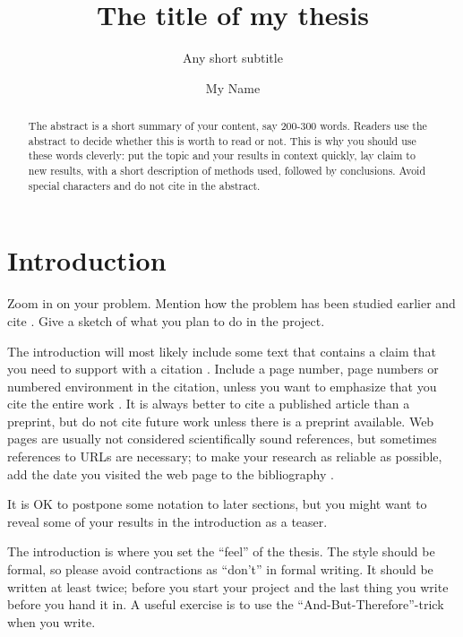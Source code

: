 \documentclass[UKenglish,bachelor]{uiomaster}  %
\title{The title of my thesis}        %
\subtitle{Any short subtitle}         %
\author{My Name}                      %
\begin{document}
\uiomasterfp[dept={Department of Mathematics},  %
  program={MAT2000 Project work in Mathematics},                        %
  supervisor={Terence Tao},                    %
  bachelor,                                   %
  color=green]                                  %


\tableofcontents

\begin{abstract}
\noindent The abstract is a short summary of your content, say 200-300 words. Readers use the abstract to decide whether this is worth to read or not. This is why you should use these words cleverly: put the topic and your results in context quickly, lay claim to new results, with a short description of methods used, followed by conclusions. Avoid special characters and do not cite in the abstract.   
\end{abstract}


\section{Introduction}
\label{intro}
Zoom in on your problem. Mention how the problem has been studied earlier and cite \parencite{MMS22}. Give a sketch of what you plan to do in the project. 

The introduction will most likely include some text that contains a claim that you need to support with a citation \cite[33--34]{AM69}. Include a page number, page numbers or numbered environment in the citation, unless you want to emphasize that you cite the entire work \cite[Theorem~1]{AM69}. It is always better to cite a published article than a preprint, but do not cite future work unless there is a preprint available. Web pages are usually not considered scientifically sound references, but sometimes references to URLs are necessary; to make your research as reliable as possible, add the date you visited the web page to the bibliography \cite{Bib15}.

It is OK to postpone some notation to later sections, but you might want to reveal some of your results in the introduction as a teaser.

The introduction is where you set the \enquote{feel} of the thesis. The style should be formal, so please avoid contractions as \enquote{don't} in formal writing. It should be written at least twice; before you start your project and the last thing you write before you hand it in. A useful exercise is to use the \enquote{And-But-Therefore}-trick when you write.
\end{document}
